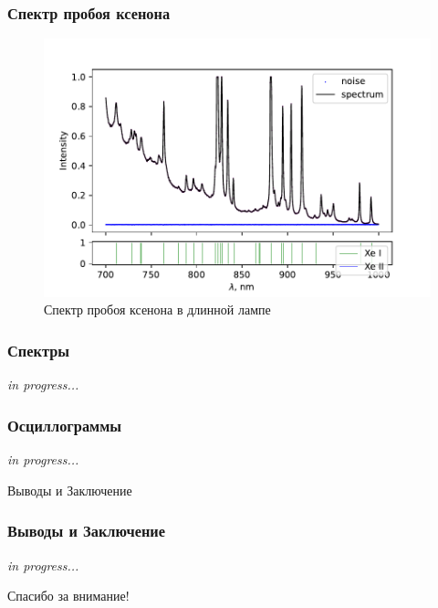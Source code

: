 \documentclass{beamer}
\begin{document}
	\begin{frame}
		\frametitle{Спектр пробоя ксенона}
		\begin{figure}
			\centering
			\includegraphics[width=\linewidth]{gen/xe_lines.pdf}
			\caption*{Спектр пробоя ксенона в длинной лампе}
		\end{figure}
	\end{frame}
	
	\begin{frame}
		\frametitle{Спектры}
		
		\begin{center}
			\huge {} \textit{in progress...}
		\end{center}
		
	\end{frame}
	
	\begin{frame}
		\frametitle{Осциллограммы}
		
		\begin{center}
			\huge {} \textit{in progress...}
		\end{center}
		
	\end{frame}
	
	\begin{frame}[plain,c]
		
		\begin{center}
			\huge {} Выводы и Заключение
		\end{center}
		
	\end{frame}
	
	\begin{frame}
		\frametitle{Выводы и Заключение}
		
		\begin{center}
			\huge {} \textit{in progress...}
		\end{center}
		
	\end{frame}
	
	
	\begin{frame}[plain,c]
		
		\begin{center}
			\huge {} Спасибо за внимание!
		\end{center}
		
	\end{frame}
	
\end{document}
